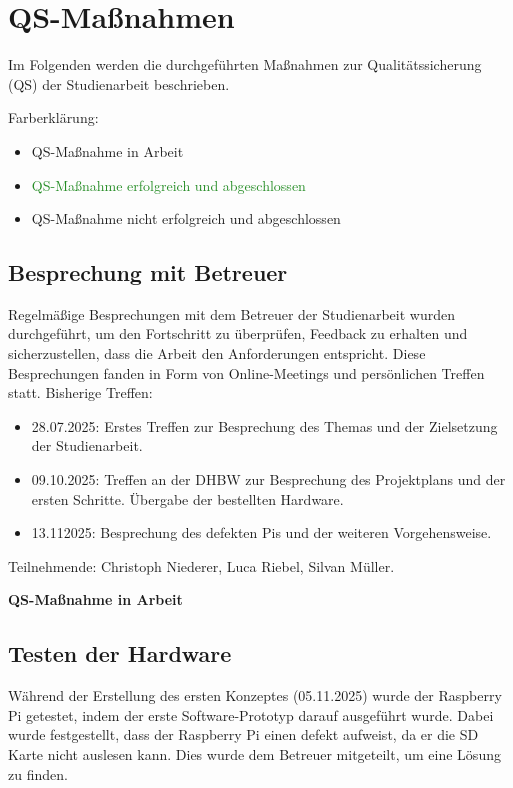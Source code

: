 \chapter{QS-Maßnahmen}
Im Folgenden werden die durchgeführten Maßnahmen zur Qualitätssicherung (QS) der Studienarbeit beschrieben.

Farberklärung:
\begin{itemize}
    \item {\textcolor{yellow!80!brown}{QS-Maßnahme in Arbeit}}
    \item {\textcolor{ForestGreen}{QS-Maßnahme erfolgreich und abgeschlossen}}
    \item {\textcolor{red!80!black}{QS-Maßnahme nicht erfolgreich und abgeschlossen}}
\end{itemize}
\section{Besprechung mit Betreuer}
Regelmäßige Besprechungen mit dem Betreuer der Studienarbeit wurden durchgeführt, um den Fortschritt zu überprüfen, Feedback zu erhalten und sicherzustellen, dass die Arbeit den Anforderungen entspricht. Diese Besprechungen fanden in Form von Online-Meetings und persönlichen Treffen statt.
Bisherige Treffen: 
\begin{itemize}
    \item 28.07.2025: Erstes Treffen zur Besprechung des Themas und der Zielsetzung der Studienarbeit.
    \item 09.10.2025: Treffen an der DHBW zur Besprechung des Projektplans und der ersten Schritte. Übergabe der bestellten Hardware.
    \item 13.112025: Besprechung des defekten Pis und der weiteren Vorgehensweise.
\end{itemize}

Teilnehmende: Christoph Niederer, Luca Riebel, Silvan Müller.

\textcolor{yellow!80!brown}{\textbf{QS-Maßnahme in Arbeit}}
\section{Testen der Hardware}
Während der Erstellung des ersten Konzeptes (05.11.2025) wurde der Raspberry Pi getestet, indem der erste Software-Prototyp darauf ausgeführt wurde. Dabei wurde festgestellt, dass der Raspberry Pi einen defekt aufweist, da er die SD Karte nicht auslesen kann. Dies wurde dem Betreuer mitgeteilt, um eine Lösung zu finden.

